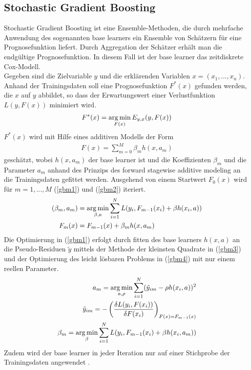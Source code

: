 \subsection{Stochastic Gradient Boosting}
Stochastic Gradient Boosting ist eine Ensemble-Methoden, die durch mehrfache Anwendung des sogenannten base learners ein Ensemble von Schätzern für eine Prognosefunktion liefert. Durch Aggregation der Schätzer erhält man die endgültige Prognosefunktion. In diesem Fall ist der base learner das zeitdiskrete Cox-Modell.\\
Gegeben sind die Zielvariable $y$ und die erklärenden Variablen $x=(x_1,...,x_n)$. Anhand der Trainingsdaten soll eine Prognosefunktion $F^*(x)$ gefunden werden, die $x$ auf $y$ abbildet, so dass der Erwartungswert einer Verlustfunktion $L(y,F(x))$ minimiert wird.
\begin{align}
	F^*(x) = \operatorname*{arg\,min}\limits_{F(x)} E_{y,x}(y,F(x))
\end{align}
$F^*(x)$ wird mit Hilfe eines additiven Modells der Form
\begin{align}
	F(x) = \sum\limits_{m=0}^M \beta_m h(x,a_m)
\end{align}
geschätzt, wobei $h(x,a_m)$ der base learner ist und die Koeffizienten $\beta_m$ und die Parameter $a_m$ anhand des Prinzips des forward stagewise additive modeling an die Trainingsdaten gefittet werden. Ausgehend von einem Startwert $F_0(x)$ wird für $m=1,...,M$ (\ref{gbm1}) und (\ref{gbm2}) iteriert.
\begin{align}
	(\beta_m,a_m) &= \operatorname*{arg\,min}\limits_{\beta,a} \sum\limits_{i=1}^N L(y_i,F_{m-1}(x_i)+\beta h(x_i,a)) \label{gbm1} \\
	F_m(x) &= F_{m-1}(x) + \beta_m h(x,a_m) \label{gbm2}
\end{align}
Die Optimierung in (\ref{gbm1}) erfolgt durch fitten des base learners $h(x,a)$ an die Pseudo-Residuen $\tilde{y}$ mittels der Methode der kleinsten Quadrate in (\ref{gbm3}) und der Optimierung des leicht lösbaren Problems in (\ref{gbm4}) mit nur einem reellen Parameter.
\begin{align}
	a_m = \operatorname*{arg\,min}\limits_{a,\rho} \sum\limits_{i=1}^N (\tilde{y}_{im} - \rho h(x_i,a))^2 \label{gbm3} \\
	\tilde{y}_{im} = - \left(\frac{\delta L(y_i,F(x_i))}{\delta F(x_i)}\right)_{F(x)=F_{m-1}(x)} \\
	\beta_m = \operatorname*{arg\,min}\limits_{\beta} \sum\limits_{i=1}^N L(y_i,F_{m-1}(x_i)+\beta h(x_i,a_m)) \label{gbm4}
\end{align}
Zudem wird der base learner in jeder Iteration nur auf einer Stichprobe der Trainingsdaten angewendet \cite{fried_stoch}.

